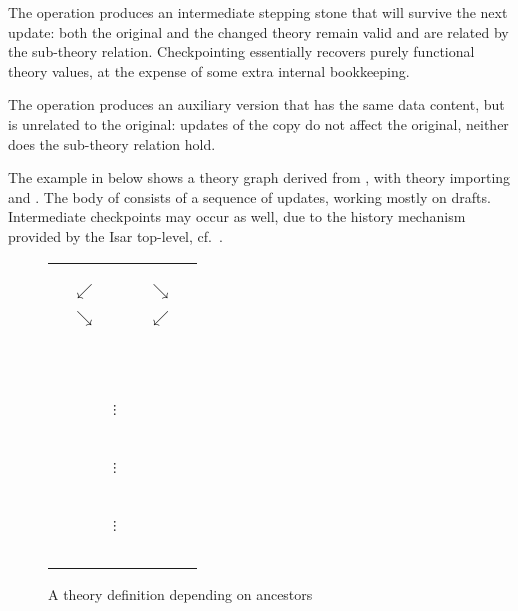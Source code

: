 \begin{isabellebody}
\begin{isamarkuptext}
  The  operation produces an intermediate stepping
  stone that will survive the next update: both the original and the
  changed theory remain valid and are related by the sub-theory
  relation.  Checkpointing essentially recovers purely functional
  theory values, at the expense of some extra internal bookkeeping.

  The  operation produces an auxiliary version that has
  the same data content, but is unrelated to the original: updates of
  the copy do not affect the original, neither does the sub-theory
  relation hold.

  \medskip The example in  below shows a theory
  graph derived from , with theory 
  importing  and .  The body of  consists of a sequence of updates, working mostly on
  drafts.  Intermediate checkpoints may occur as well, due to the
  history mechanism provided by the Isar top-level, cf.\
  .

  \begin{figure}[htb]
  \begin{center}
  \begin{tabular}{rcccl}
        &            & \isa{Pure} \\
        &            & \isa{{\isasymdown}} \\
        &            & \isa{FOL} \\
        & $\swarrow$ &              & $\searrow$ & \\
  \isa{Nat} &    &              &            & \isa{List} \\
        & $\searrow$ &              & $\swarrow$ \\
        &            & \isa{Length} \\
        &            & \multicolumn{3}{l}{~~\hyperlink{keyword.imports}{\mbox{\isa{\isakeyword{imports}}}}} \\
        &            & \multicolumn{3}{l}{~~\hyperlink{keyword.begin}{\mbox{\isa{\isakeyword{begin}}}}} \\
        &            & $\vdots$~~ \\
        &            & \isa{{\isasymbullet}}~~ \\
        &            & $\vdots$~~ \\
        &            & \isa{{\isasymbullet}}~~ \\
        &            & $\vdots$~~ \\
        &            & \multicolumn{3}{l}{~~\hyperlink{command.end}{\mbox{\isa{\isacommand{end}}}}} \\
  \end{tabular}
  \caption{A theory definition depending on ancestors}\label{fig:ex-theory}
  \end{center}
  \end{figure}


\end{isamarkuptext}
\end{isabellebody}
